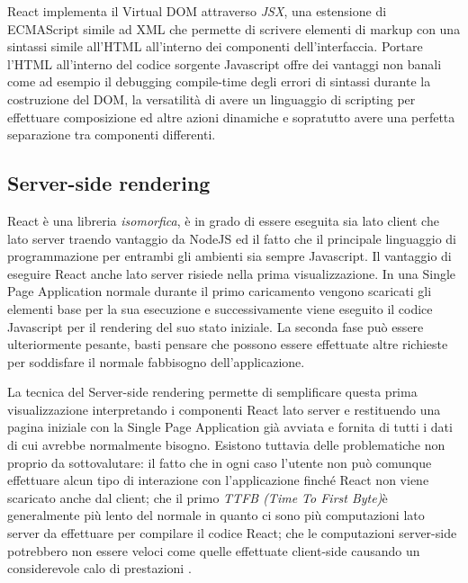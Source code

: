 React implementa il Virtual DOM attraverso \textit{JSX}, una estensione di ECMAScript simile ad XML che permette di scrivere elementi di markup con una sintassi simile all'HTML all'interno dei componenti dell'interfaccia. Portare l'HTML all'interno del codice sorgente Javascript offre dei vantaggi non banali come ad esempio il debugging compile-time degli errori di sintassi durante la costruzione del DOM, la versatilità di avere un linguaggio di scripting per effettuare composizione ed altre azioni dinamiche e sopratutto avere una perfetta separazione tra componenti differenti.


\subsection{Server-side rendering}
React è una libreria \textit{isomorfica}, è in grado di essere eseguita sia lato client che lato server traendo vantaggio da NodeJS ed il fatto che il principale linguaggio di programmazione per entrambi gli ambienti sia sempre Javascript.
Il vantaggio di eseguire React anche lato server risiede nella prima visualizzazione. In una Single Page Application normale durante il primo caricamento vengono scaricati gli elementi base per la sua esecuzione e successivamente viene eseguito il codice Javascript per il rendering del suo stato iniziale. La seconda fase può essere ulteriormente pesante, basti pensare che possono essere effettuate altre richieste per soddisfare il normale fabbisogno dell'applicazione.

La tecnica del Server-side rendering permette di semplificare questa prima visualizzazione interpretando i componenti React lato server e restituendo una pagina iniziale con la Single Page Application già avviata e fornita di tutti i dati di cui avrebbe normalmente bisogno. Esistono tuttavia delle problematiche non proprio da sottovalutare: il fatto che in ogni caso l'utente non può comunque effettuare alcun tipo di interazione con l'applicazione finché React non viene scaricato anche dal client; che il primo \textit{TTFB (Time To First Byte)}\footnotemark è generalmente più lento del normale in quanto ci sono più computazioni lato server da effettuare per compilare il codice React; che le computazioni server-side potrebbero non essere veloci come quelle effettuate client-side causando un considerevole calo di prestazioni \cite{GrigoryanOnServerSideRendering}.

